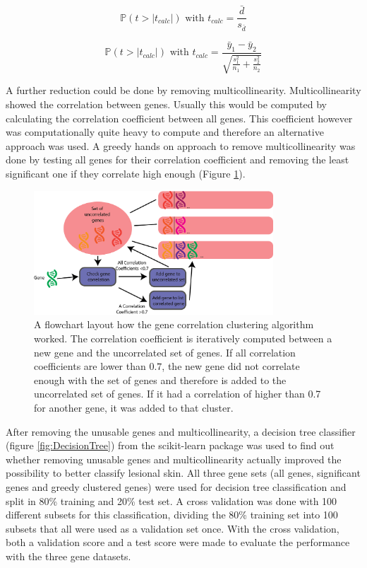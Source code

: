 \documentclass[10pt,a4paper]{article}
\begin{document}
	\begin{equation}
	\label{eq:PairedTTest}
	\mathbb{P}(t > |t_{calc}|) \text{ with } t_{calc} =\frac{\bar{d}}{s_{\bar{d}}}
	\end{equation}
	
	\begin{equation}
	\label{eq:UnequalVarianceTTest}
	\mathbb{P}(t >|t_{calc}|) \text { with } t_{calc} = \frac{\bar{y}_1 - 
		\bar{y}_2}{\sqrt{\frac{s^2_1}{n_1} + \frac{s^2_2}{n_2}}} 
	\end{equation}
	
	A further reduction could be done by removing multicollinearity. Multicollinearity showed the correlation between genes. Usually this would be computed by calculating the correlation coefficient between all genes. This coefficient however was computationally quite heavy to compute and therefore an alternative approach was used. A greedy hands on approach to remove multicollinearity was done by testing all genes for their correlation coefficient and removing the least significant one if they correlate high enough (Figure \ref{fig:GreedyCorrelationClustering}).
	
	\begin{figure}[H]
		\includegraphics[width=0.8\textwidth]{GreedyClustering.png}
		\caption{A flowchart layout how the gene correlation clustering algorithm worked. The correlation coefficient is iteratively computed between a new gene and the uncorrelated set of genes. If all correlation coefficients are lower than $0.7$, the new gene did not correlate enough with the set of genes and therefore is added to the uncorrelated set of genes. If it had a correlation of higher than 0.7 for another gene, it was added to that cluster.}
		\label{fig:GreedyCorrelationClustering}
	\end{figure}
	
	After removing the unusable genes and multicollinearity, a decision tree classifier (figure \ref{fig:DecisionTree}) from the scikit-learn package was used to find out whether removing unusable genes and multicollinearity actually improved the possibility to better classify lesional skin. All three gene sets (all genes, significant genes and greedy clustered genes) were used for decision tree classification and split in 80\% training and 20\% test set. A cross validation was done with 100 different subsets for this classification, dividing the 80\% training set into 100 subsets that all were used as a validation set once. With the cross validation, both a validation score and a test score were made to evaluate the performance with the three gene datasets.
	
\end{document}
